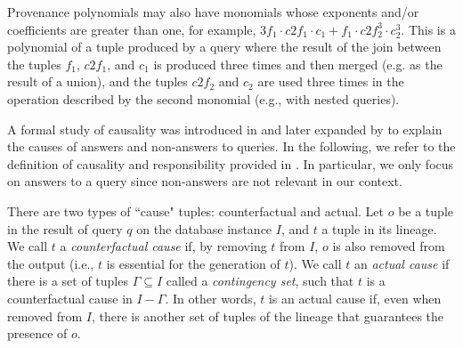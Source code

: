 Provenance polynomials may also have monomials whose exponents and/or coefficients are greater than one, for example, $3f_1 \cdot c2f_1 \cdot c_1 + f_1 \cdot c2f_2^3 \cdot c_2^3$. This is a polynomial of a tuple produced by a query where the result of the join between the tuples $f_1$, $c2f_1$, and $c_1$ is produced three times and then merged (e.g. as the result of a union), and the tuples $c2f_2$ and $c_2$ are used three times in the operation described by the second monomial (e.g., with nested queries). 

\label{sec:responsibility}

A formal study of causality was introduced in \cite{Halpern2013Causality,ChocklerH04} and later expanded by \citet{MeliouGMS11} to explain the causes of answers and non-answers to queries. 
In the following, we refer to the definition of causality and responsibility provided in \cite{MeliouGMS11}. 
In particular, we only focus on answers to a query since non-answers are not relevant in our context.


There are two types of ``cause" tuples: counterfactual and actual. 
Let $o$ be a tuple in the result of query $q$ on the database instance $I$, and $t$ a tuple in its lineage. We call $t$ a \emph{counterfactual cause} if, by removing $t$ from $I$, $o$ is also removed from the output (i.e., $t$ is essential for the generation of $t$). 
We call $t$ an \emph{actual cause} if there is a set of tuples $\Gamma \subseteq I$ called a \emph{contingency set}, such that $t$ is a counterfactual cause in $I - \Gamma$. In other words, $t$ is an actual cause if, even when removed from $I$, there is another set of tuples of the lineage that guarantees the presence of $o$.

